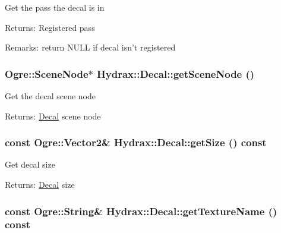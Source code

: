 Get the pass the decal is in \begin{Desc}
\item[Returns:]Registered pass \end{Desc}
\begin{Desc}
\item[Remarks:]return NULL if decal isn't registered \end{Desc}
\hypertarget{class_hydrax_1_1_decal_c2570f0d1977b11ccb5746a3518210c2}{
\subsubsection[{getSceneNode}]{\setlength{\rightskip}{0pt plus 5cm}Ogre::SceneNode$\ast$ Hydrax::Decal::getSceneNode ()}}
\label{class_hydrax_1_1_decal_c2570f0d1977b11ccb5746a3518210c2}


Get the decal scene node \begin{Desc}
\item[Returns:]\hyperlink{class_hydrax_1_1_decal}{Decal} scene node \end{Desc}
\hypertarget{class_hydrax_1_1_decal_2d4f5cfd15c4450a87063e50e178f4ff}{
\subsubsection[{getSize}]{\setlength{\rightskip}{0pt plus 5cm}const Ogre::Vector2\& Hydrax::Decal::getSize () const}}
\label{class_hydrax_1_1_decal_2d4f5cfd15c4450a87063e50e178f4ff}


Get decal size \begin{Desc}
\item[Returns:]\hyperlink{class_hydrax_1_1_decal}{Decal} size \end{Desc}
\hypertarget{class_hydrax_1_1_decal_c7645e2aca71f621bace32fd8749db84}{
\subsubsection[{getTextureName}]{\setlength{\rightskip}{0pt plus 5cm}const Ogre::String\& Hydrax::Decal::getTextureName () const}}
\label{class_hydrax_1_1_decal_c7645e2aca71f621bace32fd8749db84}


